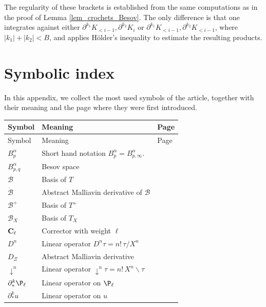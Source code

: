 \documentclass[11pt]{preprint}
\def\CB{\mathcal{B}}
\newcommand{\mcB}{\mathcal{B}}
\newcommand{\bfC}{{\bf C}}
\begin{document}
\begin{appendix}
The regularity of these brackets is established from the same computations as in the proof of Lemma \ref{lem_crochets_Besov}. The only difference is that one integrates against either $\partial^{k_1}K_{<i-1},\partial^{k_2}K_i$ or $\partial^{k_1}K_{<i-1},\partial^{k_2}K_{<i-1}$, where $|k_1|+|k_2|<B$, and applies Hölder's inequality to estimate the resulting products.
	
	\section{Symbolic index}
	\label{Appendix_C}
	In this appendix, we collect the most used symbols of the article, together
	with their meaning and the page where they were first introduced.
	\begin{center}
		\renewcommand{\arraystretch}{1.1}
		\begin{longtable}{lll}
			\toprule
			Symbol & Meaning & Page\\
			\midrule
			\endfirsthead
			\toprule
			Symbol & Meaning & Page\\
			\midrule
			\endhead
			\bottomrule
			\endfoot
			\bottomrule
			\endlastfoot
	$B^{\alpha}_p $	& Short hand notation $B^{\alpha}_p =B^\alpha_{p,\infty}$.  & \pageref{besov}	\\
		$	B^{\alpha}_{p,q} $ & Besov space & \pageref{besov} 
			\\
		$\mcB$ & Basis of $T$ &  \pageref{subsection_basicsRS}
			\\
				$\dot{\mcB}$ & Abstract Malliavin derivative of $ \mcB $ &  \pageref{subsection_basicsRS}
			\\
				$\mcB^+$ & Basis of $T^+$ &  \pageref{subsection_basicsRS}
			\\
			$\CB_X$ & Basis of $T_X$ &  \pageref{eq_sigmabackslashtau}
			\\
		$ \bfC_\ell $	& Corrector with weight $ \ell $   &  \pageref{eqdef_corrector}
			\\
		$ D^n $ & Linear operator $ 	D^n\tau = n! \,  \tau / X^n  $  &	\pageref{linear_operator}
		\\
		$D_{\Xi}$ & Abstract Malliavin derivative  & \pageref{D_Xi}
		\\ 
			$ \downarrow^n $  & Linear operator $ \downarrow^n \tau =  n!\, X^n \backslash \tau$ & \pageref{linear_operator}
			\\
	 $ \partial^k_* \P_\ell$ & Linear operator on $ \P_\ell $ &	\pageref{eqdef_starderivative}	
	 \\
	 $ \partial^k_* u$ & Linear operator on $u$ &	\pageref{eqdef_partialStarU}	

\end{longtable}
\end{center}
\end{appendix}
\end{document}
